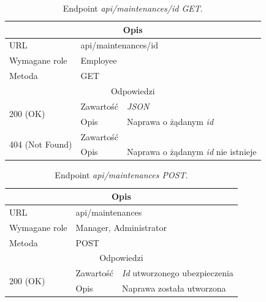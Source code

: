 \documentclass[eng,printmode,openany]{mgr}
\begin{document}
	\begin{table}[H]
		\caption{Endpoint \textit{api/maintenances/id GET}.}
		\begin{tabularx}{\textwidth}{|l|l|X|}
			\hline
			\multicolumn{3}{|c|}{Opis}
			\\ \hline
			URL                         & \multicolumn{2}{l|}{api/maintenances/id}
			\\ \hline
			Wymagane role               & \multicolumn{2}{l|}{Employee}
			\\ \hline
			Metoda                      & \multicolumn{2}{l|}{GET}
			\\ \hline
			\multicolumn{3}{|c|}{Odpowiedzi}
			\\ \hline
			\multirow{2}{*}{200 (OK)} 	        & Zawartość   	& \textit{JSON}
			\\ \cline{2-3}                      & Opis         	& Naprawa o żądanym \textit{id}
			\\ \hline
			\multirow{2}{*}{404 (Not Found)} 	& Zawartość     & 
			\\ \cline{2-3}                      & Opis          & Naprawa o żądanym \textit{id} nie istnieje
			\\ \hline
		\end{tabularx}
	\end{table}
	
	\begin{table}[H]
		\caption{Endpoint \textit{api/maintenances POST}.}
		\begin{tabularx}{\textwidth}{|l|l|X|}
			\hline
			\multicolumn{3}{|c|}{Opis}
			\\ \hline
			URL                       & \multicolumn{2}{l|}{api/maintenances}
			\\ \hline
			Wymagane role             & \multicolumn{2}{l|}{Manager, Administrator}
			\\ \hline
			Metoda                    & \multicolumn{2}{l|}{POST}
			\\ \hline
			\multicolumn{3}{|c|}{Odpowiedzi}
			\\ \hline
			\multirow{2}{*}{200 (OK)} 		& Zawartość     & \textit{Id} utworzonego ubezpieczenia
			\\ \cline{2-3}                  & Opis         	& Naprawa została utworzona
			\\ \hline
		\end{tabularx}
	\end{table}
	
\end{document}
